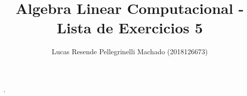 \documentclass[11pt]{article}
\begin{document}
  {}%
  {}%
  {}%
  {}%
  {\bfseries}%
  {.}%
  {\newline}%
  {}%

\theoremstyle{definition}
\theoremstyle{break}
\newtheorem{exerc}{Exercício}

\author{Lucas Resende Pellegrinelli Machado (2018126673)}
\title{Algebra Linear Computacional - Lista de Exercicios 5}
\maketitle

\medskip
\end{document}
